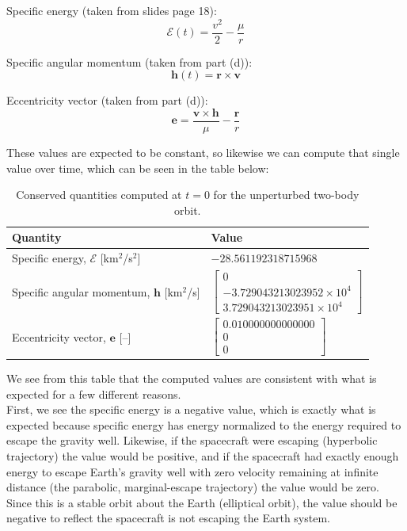 \documentclass[titlepage]{article}
\begin{document}
Specific energy (taken from slides page 18):
\begin{equation}
	\mathcal{E}(t)=\frac{v^2}{2}-\frac{\mu}{r}
\end{equation}

Specific angular momentum (taken from part (d)):
\begin{equation}
	\boldsymbol{h}(t)=\boldsymbol{r}\times\boldsymbol{v}
\end{equation}

Eccentricity vector (taken from part (d)):
\begin{equation}
	\boldsymbol{e}=\frac{\boldsymbol{v}\times\boldsymbol{h}}{\mu}-\frac{\boldsymbol{r}}{r}
\end{equation}

\begin{mdframed}[linewidth=1pt, innertopmargin=10pt, innerbottommargin=10pt]
	These values are expected to be constant, so likewise we can compute that single value over time, which can be seen in the table below:
	\begin{table}[H]
		\centering
		\caption{Conserved quantities computed at $t=0$ for the unperturbed two-body orbit.}
		\label{tab:g2_conserved}
		\begin{tabular}{|l|l|}
			\hline
			Quantity & Value \\
			\hline
			Specific energy, $\mathcal{E}$ [km$^2$/s$^2$] & $-28.561192318715968$ \\
			\hline
			Specific angular momentum, $\boldsymbol{h}$ [km$^2$/s] &
			$\begin{bmatrix} 0 \\ -3.729043213023952\times10^{4} \\ 3.729043213023951\times10^{4} \end{bmatrix}$ \\
			\hline
			Eccentricity vector, $\boldsymbol{e}$ [--] &
			$\begin{bmatrix} 0.010000000000000 \\ 0 \\ 0 \end{bmatrix}$ \\
			\hline
		\end{tabular}
	\end{table}
	
	We see from this table that the computed values are consistent with what is expected for a few different reasons.\\
	
	First, we see the specific energy is a negative value, which is exactly what is expected because specific energy has energy normalized to the energy required to escape the gravity well. Likewise, if the spacecraft were escaping (hyperbolic trajectory) the value would be positive, and if the spacecraft had exactly enough energy to escape Earth's gravity well with zero velocity remaining at infinite distance (the parabolic, marginal-escape trajectory) the value would be zero. Since this is a stable orbit about the Earth (elliptical orbit), the value should be negative to reflect the spacecraft is not escaping the Earth system.\\
	

\end{mdframed}
\end{document}
